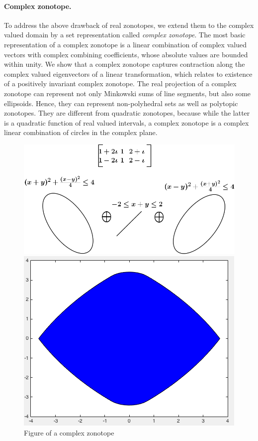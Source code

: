\documentclass[11pt,a4paper,twoside,openright]{article}
\begin{document}
\paragraph{Complex zonotope.}  To address the above drawback of real
zonotopes, we extend them to the complex valued domain by a set
representation called {\it complex zonotope}.  The most basic
representation of a complex zonotope is a linear combination of
complex valued vectors with complex combining coefficients, whose
absolute values are bounded within unity.  We show that a complex
zonotope captures contraction along the complex valued eigenvectors of
a linear transformation, which relates to existence of a positively
invariant complex zonotope.  The real projection of a complex zonotope
can represent not only Minkowski sums of line segments, but also some
ellipsoids.  Hence, they can represent non-polyhedral sets as well as
polytopic zonotopes.  They are different from quadratic zonotopes,
because while the latter is a quadratic function of real valued
intervals, a complex zonotope is a complex linear combination of
circles in the complex plane.
%
\begin{figure}
  \begin{minipage}{0.5\textwidth}
    \includegraphics[scale=0.6]{figures/complex-zonotope.png}
  \end{minipage}
  \hspace{5em}
  \begin{minipage}{0.4\textwidth}
    \includegraphics[scale=0.3]{figures/CZhull.png}
  \end{minipage}
  \caption{Figure of a complex zonotope}
\end{figure}
%
\end{document}
